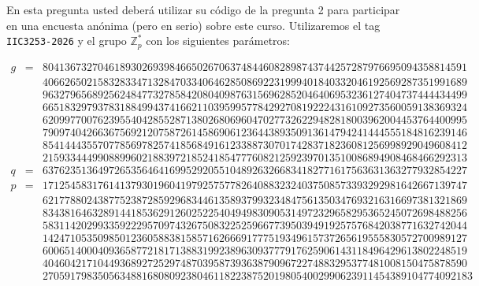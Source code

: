 
En esta pregunta usted deberá utilizar su código de la pregunta 2 para participar en una encuesta anónima (pero en serio) sobre este curso. Utilizaremos el tag \texttt{IIC3253-2026} y el grupo $\mathbb{Z}_p^*$ con los siguientes parámetros:

\begin{eqnarray*}
	g & = & 80413673270461893026939846650267063748446082898743744257287976695094358814591\\
	&&40662650215832833471328470334064628508692231999401840332046192569287351991689\\
	&&96327965689256248477327858420804098763156962852046406953236127404737444434499\\
	&&66518329793783188499437416621103959957784292708192224316109273560059138369324\\
	&&62099770076239554042855287138026806960470277326229482818003962004453764400995\\
	&&79097404266367569212075872614586906123644389350913614794241444555184816239146\\
	&&85414443557077856978257418568491612338873070174283718236081256998929049608412\\
	&&21593344499088996021883972185241854777608212592397013510086894908468466292313\\
	q & = & 63762351364972653564641699529205510489263266834182771617563631363277932854227\\
	p & = & 17125458317614137930196041979257577826408832324037508573393292981642667139747\\
	&&62177880243877523872859296834461358937993234847561350347693216316697381321869\\
	&&83438164632891441853629126025225404949830905314972329658295365245072698488256\\
	&&58311420299335922295709743267508322525966773950394919257576842038771632742044\\
	&&14247105350985012360588381585716266691777519349615737265619555830572700989127\\
	&&60065140004093658772181713883199238963093777917625906143118496429613802248519\\
	&&40460421710449368927252974870395873936387909672274883295377481008150475878590\\
	&&270591798350563488168080923804611822387520198054002990623911454389104774092183\\
\end{eqnarray*}

